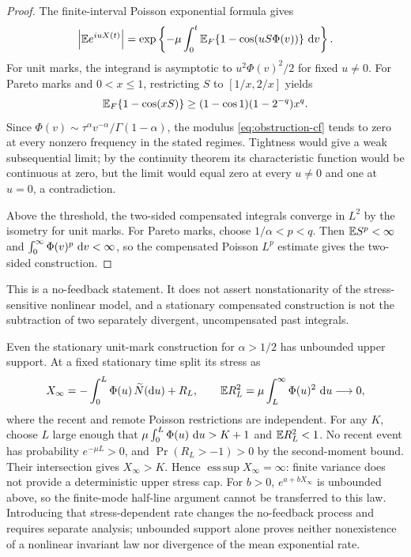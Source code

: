 \begin{proof}
The finite-interval Poisson exponential formula gives
\begin{equation}\label{eq:obstruction-cf}
\left|\mathbb{E}  e^{iuX(t)}\right|
=\exp\left\{-\mu\int_0^t
\mathbb{E} _F\{1-\cos(uS\Phi(v))\}\,\mathop{}\!\mathrm{d} v\right\}.
\end{equation}
For unit marks, the integrand is asymptotic to \(u^2\Phi(v)^2/2\) for fixed \(u\neq0\). For Pareto marks and \(0<x\leq1\), restricting \(S\) to \([1/x,2/x]\) yields
\[
\mathbb{E} _F\{1-\cos(xS)\}
\geq(1-\cos1)(1-2^{-q})x^q.
\]
Since
\(\Phi(v)\sim\tau^\alpha v^{-\alpha}/\Gamma(1-\alpha)\),
the modulus \eqref{eq:obstruction-cf} tends to zero at every nonzero frequency in the stated regimes. Tightness would give a weak subsequential limit; by the continuity theorem its characteristic function would be continuous at zero, but the limit would equal zero at every \(u\neq0\) and one at \(u=0\), a contradiction.

Above the threshold, the two-sided compensated integrals converge in \(L^2\) by the isometry for unit marks. For Pareto marks, choose \(1/\alpha<p<q\). Then \(\mathbb{E}  S^p<\infty\) and \(\int_0^\infty\Phi(v)^p\,\mathop{}\!\mathrm{d} v<\infty\), so the compensated Poisson \(L^p\) estimate gives the two-sided construction.
\end{proof}

This is a no-feedback statement. It does not assert nonstationarity of the stress-sensitive nonlinear model, and a stationary compensated construction is not the subtraction of two separately divergent, uncompensated past integrals.

Even the stationary unit-mark construction for \(\alpha>1/2\) has unbounded upper support. At a fixed stationary time split its stress as
\[
X_\infty=-\int_0^L\Phi(u)\,\widetilde N(\mathop{}\!\mathrm{d} u)+R_L,
\qquad \mathbb{E} R_L^2=\mu\int_L^\infty\Phi(u)^2\,\mathop{}\!\mathrm{d} u\longrightarrow0,
\]
where the recent and remote Poisson restrictions are independent. For any \(K\), choose \(L\) large enough that \(\mu\int_0^L\Phi(u)\,\mathop{}\!\mathrm{d} u>K+1\) and \(\mathbb{E} R_L^2<1\). No recent event has probability \(e^{-\mu L}>0\), and \(\Pr(R_L>-1)>0\) by the second-moment bound. Their intersection gives \(X_\infty>K\). Hence \(\operatorname{ess\,sup}X_\infty=\infty\): finite variance does not provide a deterministic upper stress cap. For \(b>0\), \(e^{a+bX_\infty}\) is unbounded above, so the finite-mode half-line argument cannot be transferred to this law. Introducing that stress-dependent rate changes the no-feedback process and requires separate analysis; unbounded support alone proves neither nonexistence of a nonlinear invariant law nor divergence of the mean exponential rate.

